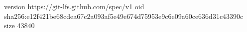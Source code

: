 version https://git-lfs.github.com/spec/v1
oid sha256:e12f421be68cdea67c2a093af5e49e674d75953e9c6e09a60ce636d31c43390c
size 43840
